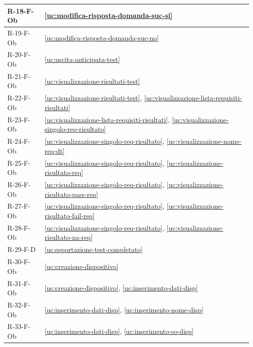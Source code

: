 ﻿\documentclass[a4paper,12pt]{article}
\begin{document}
{\begin{longtable}{|
      >{\centering\arraybackslash}p{}|
      >{\centering\arraybackslash}p{}|
      }
            R-18-F-Ob       & \ref{uc:modifica-risposta-domanda-suc-si}                                                 \\ \hline
            R-19-F-Ob       & \ref{uc:modifica-risposta-domanda-suc-no}                                                 \\ \hline
            R-20-F-Ob       & \ref{uc:uscita-anticipata-test}                                                 \\ \hline
            R-21-F-Ob       & \ref{uc:visualizzazione-risultati-test}                                               \\ \hline
            R-22-F-Ob       & \ref{uc:visualizzazione-risultati-test}, \ref{uc:visualizzazione-lista-requisiti-risultati}                 \\ \hline
            R-23-F-Ob       & \ref{uc:visualizzazione-lista-requisiti-risultati}, \ref{uc:visualizzazione-singolo-req-risultato}         \\ \hline
            R-24-F-Ob       & \ref{uc:visualizzazione-singolo-req-risultato}, \ref{uc:visualizzazione-nome-req-dt}         \\ \hline
            R-25-F-Ob       & \ref{uc:visualizzazione-singolo-req-risultato}, \ref{uc:visualizzazione-risultato-req} \\ \hline
            R-26-F-Ob       & \ref{uc:visualizzazione-singolo-req-risultato}, \ref{uc:visualizzazione-risultato-pass-req} \\ \hline
            R-27-F-Ob       & \ref{uc:visualizzazione-singolo-req-risultato}, \ref{uc:visualizzazione-risultato-fail-req} \\ \hline
            R-28-F-Ob       & \ref{uc:visualizzazione-singolo-req-risultato}, \ref{uc:visualizzazione-risultato-na-req} \\ \hline
            R-29-F-D        & \ref{uc:esportazione-test-completato}                                               \\ \hline
            R-30-F-Ob       & \ref{uc:creazione-dispositivo}                                               \\ \hline
            R-31-F-Ob       & \ref{uc:creazione-dispositivo}, \ref{uc:inserimento-dati-disp}                 \\ \hline
            R-32-F-Ob       & \ref{uc:inserimento-dati-disp}, \ref{uc:inserimento-nome-disp}         \\ \hline
            R-33-F-Ob       & \ref{uc:inserimento-dati-disp}, \ref{uc:inserimento-so-disp}         \\ \hline

\end{longtable}}
\end{document}
